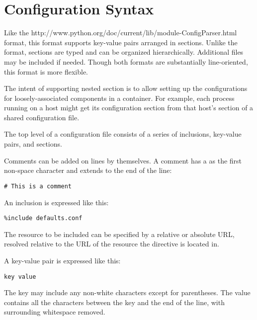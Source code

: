 \documentclass{howto}
\begin{document}
\section{Configuration Syntax \label{syntax}}

Like the 
{http://www.python.org/doc/current/lib/module-ConfigParser.html}
format, this format supports key-value pairs arranged in sections.
Unlike the  format, sections are typed and can be
organized hierarchically.
Additional files may be included if needed.  Though both formats are
substantially line-oriented, this format is more flexible.

The intent of supporting nested section is to allow setting up the
configurations for loosely-associated components in a container.  For
example, each process running on a host might get its configuration
section from that host's section of a shared configuration file.

The top level of a configuration file consists of a series of
inclusions, key-value pairs, and sections.

Comments can be added on lines by themselves.  A comment has a
\character{\#} as the first non-space character and extends to the end
of the line:

\begin{verbatim}
# This is a comment
\end{verbatim}

An inclusion is expressed like this:

\begin{verbatim}
%include defaults.conf
\end{verbatim}

The resource to be included can be specified by a relative or absolute
URL, resolved relative to the URL of the resource the
 directive is located in.


A key-value pair is expressed like this:

\begin{verbatim}
key value
\end{verbatim}

The key may include any non-white characters except for parentheses.
The value contains all the characters between the key and the end of
the line, with surrounding whitespace removed.
\end{document}
